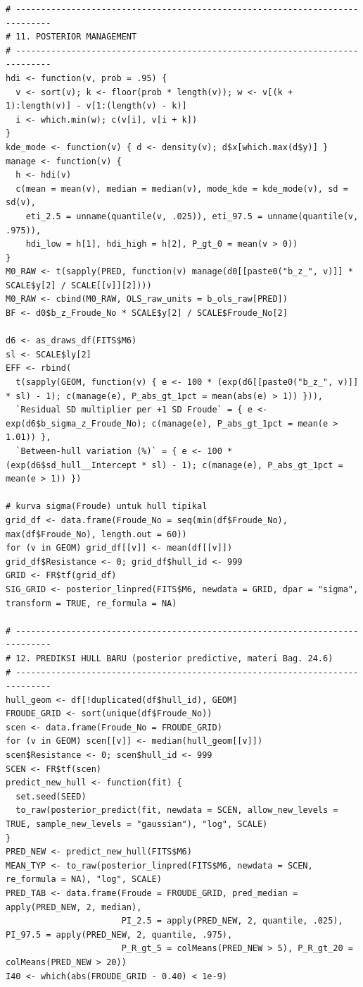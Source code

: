 \documentclass[
]{article}
\begin{document}
\begin{verbatim}
# -----------------------------------------------------------------------------
# 11. POSTERIOR MANAGEMENT
# -----------------------------------------------------------------------------
hdi <- function(v, prob = .95) {
  v <- sort(v); k <- floor(prob * length(v)); w <- v[(k + 1):length(v)] - v[1:(length(v) - k)]
  i <- which.min(w); c(v[i], v[i + k])
}
kde_mode <- function(v) { d <- density(v); d$x[which.max(d$y)] }
manage <- function(v) {
  h <- hdi(v)
  c(mean = mean(v), median = median(v), mode_kde = kde_mode(v), sd = sd(v),
    eti_2.5 = unname(quantile(v, .025)), eti_97.5 = unname(quantile(v, .975)),
    hdi_low = h[1], hdi_high = h[2], P_gt_0 = mean(v > 0))
}
M0_RAW <- t(sapply(PRED, function(v) manage(d0[[paste0("b_z_", v)]] * SCALE$y[2] / SCALE[[v]][2])))
M0_RAW <- cbind(M0_RAW, OLS_raw_units = b_ols_raw[PRED])
BF <- d0$b_z_Froude_No * SCALE$y[2] / SCALE$Froude_No[2]

d6 <- as_draws_df(FITS$M6)
sl <- SCALE$ly[2]
EFF <- rbind(
  t(sapply(GEOM, function(v) { e <- 100 * (exp(d6[[paste0("b_z_", v)]] * sl) - 1); c(manage(e), P_abs_gt_1pct = mean(abs(e) > 1)) })),
  `Residual SD multiplier per +1 SD Froude` = { e <- exp(d6$b_sigma_z_Froude_No); c(manage(e), P_abs_gt_1pct = mean(e > 1.01)) },
  `Between-hull variation (%)` = { e <- 100 * (exp(d6$sd_hull__Intercept * sl) - 1); c(manage(e), P_abs_gt_1pct = mean(e > 1)) })

# kurva sigma(Froude) untuk hull tipikal
grid_df <- data.frame(Froude_No = seq(min(df$Froude_No), max(df$Froude_No), length.out = 60))
for (v in GEOM) grid_df[[v]] <- mean(df[[v]])
grid_df$Resistance <- 0; grid_df$hull_id <- 999
GRID <- FR$tf(grid_df)
SIG_GRID <- posterior_linpred(FITS$M6, newdata = GRID, dpar = "sigma", transform = TRUE, re_formula = NA)

# -----------------------------------------------------------------------------
# 12. PREDIKSI HULL BARU (posterior predictive, materi Bag. 24.6)
# -----------------------------------------------------------------------------
hull_geom <- df[!duplicated(df$hull_id), GEOM]
FROUDE_GRID <- sort(unique(df$Froude_No))
scen <- data.frame(Froude_No = FROUDE_GRID)
for (v in GEOM) scen[[v]] <- median(hull_geom[[v]])
scen$Resistance <- 0; scen$hull_id <- 999
SCEN <- FR$tf(scen)
predict_new_hull <- function(fit) {
  set.seed(SEED)
  to_raw(posterior_predict(fit, newdata = SCEN, allow_new_levels = TRUE, sample_new_levels = "gaussian"), "log", SCALE)
}
PRED_NEW <- predict_new_hull(FITS$M6)
MEAN_TYP <- to_raw(posterior_linpred(FITS$M6, newdata = SCEN, re_formula = NA), "log", SCALE)
PRED_TAB <- data.frame(Froude = FROUDE_GRID, pred_median = apply(PRED_NEW, 2, median),
                       PI_2.5 = apply(PRED_NEW, 2, quantile, .025), PI_97.5 = apply(PRED_NEW, 2, quantile, .975),
                       P_R_gt_5 = colMeans(PRED_NEW > 5), P_R_gt_20 = colMeans(PRED_NEW > 20))
I40 <- which(abs(FROUDE_GRID - 0.40) < 1e-9)


\end{verbatim}
\end{document}
